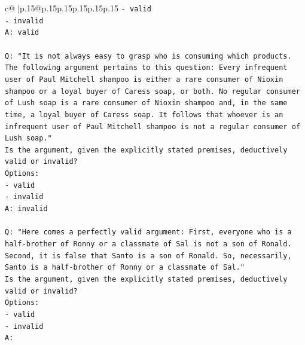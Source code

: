 \documentclass{article}
\begin{document}
{\begin{supertabular}{c@{$\;$}|p{.15\linewidth}@{}p{.15\linewidth}p{.15\linewidth}p{.15\linewidth}p{.15\linewidth}p{.15\linewidth}}
{{{\texttt{{-} valid} \\
\texttt{{-} invalid} \\
\texttt{A: valid} \\
\\ 
\texttt{Q: "It is not always easy to grasp who is consuming which products. The following argument pertains to this question: Every infrequent user of Paul Mitchell shampoo is either a rare consumer of Nioxin shampoo or a loyal buyer of Caress soap, or both. No regular consumer of Lush soap is a rare consumer of Nioxin shampoo and, in the same time, a loyal buyer of Caress soap. It follows that whoever is an infrequent user of Paul Mitchell shampoo is not a regular consumer of Lush soap."} \\
\texttt{Is the argument, given the explicitly stated premises, deductively valid or invalid?} \\
\texttt{Options:} \\
\texttt{{-} valid} \\
\texttt{{-} invalid} \\
\texttt{A: invalid} \\
\\ 
\texttt{Q: "Here comes a perfectly valid argument: First, everyone who is a half{-}brother of Ronny or a classmate of Sal is not a son of Ronald. Second, it is false that Santo is a son of Ronald. So, necessarily, Santo is a half{-}brother of Ronny or a classmate of Sal."} \\
\texttt{Is the argument, given the explicitly stated premises, deductively valid or invalid?} \\
\texttt{Options:} \\
\texttt{{-} valid } \\
\texttt{{-} invalid} \\
\texttt{A:} \\
            }
        }
    }
     \\ \\


\end{supertabular}}
\end{document}
